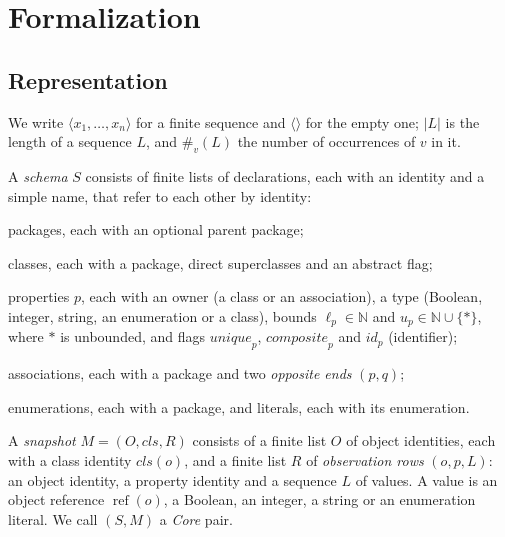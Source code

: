 \section{Formalization}\label{sec:formalization}
\subsection{Representation}\label{sec:representation}
We write $\langle x_1,\ldots,x_n\rangle$ for a finite sequence and $\langle\rangle$
for the empty one; $|L|$ is the length of a sequence $L$, and $\#_v(L)$ the number
of occurrences of $v$ in it.

\begin{definition}[Schema]\label{def:schema}
A \emph{schema} $S$ consists of finite lists of declarations, each with an
identity and a simple name, that refer to each other by identity:
\begin{list}{}{\setlength{\leftmargin}{6mm}\setlength{\labelwidth}{5mm}%
 \setlength{\itemsep}{0pt}\setlength{\parsep}{0pt}\setlength{\topsep}{1pt}}
\item[(a)] packages, each with an optional parent package;
\item[(b)] classes, each with a package, direct superclasses and an abstract flag;
\item[(c)] properties $p$, each with an owner (a class or an association), a type
 (Boolean, integer, string, an enumeration or a class), bounds
 $\ell_p\in\mathbb N$ and $u_p\in\mathbb N\cup\{\ast\}$, where $\ast$ is
 unbounded, and flags $\mathit{unique}_p$, $\mathit{composite}_p$ and
 $\mathit{id}_p$ (identifier);
\item[(d)] associations, each with a package and two \emph{opposite ends} $(p,q)$;
\item[(e)] enumerations, each with a package, and literals, each with its enumeration.
\end{list}
\end{definition}

\begin{definition}[Snapshot]\label{def:snapshot}
A \emph{snapshot} $M=(O,\mathit{cls},R)$ consists of a finite list $O$ of object
identities, each with a class identity $\mathit{cls}(o)$, and a finite list $R$
of \emph{observation rows} $(o,p,L)$: an object identity, a property identity and
a sequence $L$ of values. A value is an object reference $\operatorname{ref}(o)$,
a Boolean, an integer, a string or an enumeration literal. We call $(S,M)$ a
\emph{Core} pair.
\end{definition}

